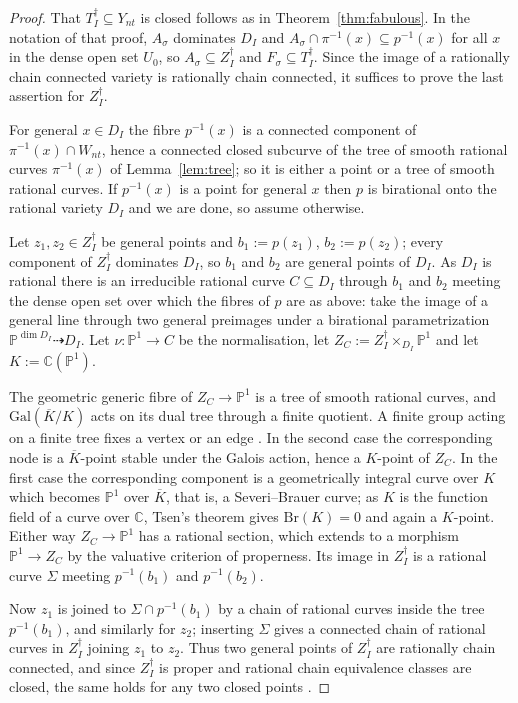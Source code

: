 \documentclass[11pt]{amsart}
\theoremstyle{plain}
\theoremstyle{definition}
\theoremstyle{remark}
\numberwithin{equation}{section}
\begin{document}
\begin{proof}
That $T_I^\dagger \subseteq Y_{nt}$ is closed follows as in
Theorem~\ref{thm:fabulous}.  In the notation of that proof, $A_\sigma$
dominates $D_I$ and $A_\sigma \cap \pi^{-1}(x) \subseteq p^{-1}(x)$ for all
$x$ in the dense open set $U_0$, so $A_\sigma \subseteq Z_I^\dagger$ and
$F_\sigma \subseteq T_I^\dagger$.  Since the image of a rationally chain
connected variety is rationally chain connected, it suffices to prove the
last assertion for $Z_I^\dagger$.

For general $x \in D_I$ the fibre $p^{-1}(x)$ is a connected component of
$\pi^{-1}(x) \cap W_{nt}$, hence a connected closed subcurve of the tree of
smooth rational curves $\pi^{-1}(x)$ of Lemma~\ref{lem:tree}; so it is
either a point or a tree of smooth rational curves.  If $p^{-1}(x)$ is a
point for general $x$ then $p$ is birational onto the rational variety
$D_I$ and we are done, so assume otherwise.

Let $z_1, z_2 \in Z_I^\dagger$ be general points and $b_1 := p(z_1)$,
$b_2 := p(z_2)$; every component of $Z_I^\dagger$ dominates $D_I$, so
$b_1$ and $b_2$ are general points of $D_I$.  As $D_I$ is rational there is
an irreducible rational curve $C \subseteq D_I$ through $b_1$ and $b_2$
meeting the dense open set over which the fibres of $p$ are as above: take
the image of a general line through two general preimages under a
birational parametrization $\mathbb{P}^{\dim D_I} \dasharrow D_I$.  Let
$\nu : \mathbb{P}^1 \to C$ be the normalisation, let
$Z_C := Z_I^\dagger \times_{D_I} \mathbb{P}^1$ and let $K :=
\mathbb{C}(\mathbb{P}^1)$.

The geometric generic fibre of $Z_C \to \mathbb{P}^1$ is a tree of smooth
rational curves, and $\mathrm{Gal}(\overline{K}/K)$ acts on its dual tree
through a finite quotient.  A finite group acting on a finite tree fixes a
vertex or an edge \cite{SerreTrees}.  In the second case the corresponding
node is a $\overline{K}$-point stable under the Galois action, hence a
$K$-point of $Z_C$.  In the first case the corresponding component is a
geometrically integral curve over $K$ which becomes $\mathbb{P}^1$ over
$\overline{K}$, that is, a Severi--Brauer curve; as $K$ is the function
field of a curve over $\mathbb{C}$, Tsen's theorem gives
$\mathrm{Br}(K) = 0$ and again a $K$-point.  Either way $Z_C \to
\mathbb{P}^1$ has a rational section, which extends to a morphism
$\mathbb{P}^1 \to Z_C$ by the valuative criterion of properness.  Its image
in $Z_I^\dagger$ is a rational curve $\Sigma$ meeting $p^{-1}(b_1)$ and
$p^{-1}(b_2)$.

Now $z_1$ is joined to $\Sigma \cap p^{-1}(b_1)$ by a chain of rational
curves inside the tree $p^{-1}(b_1)$, and similarly for $z_2$; inserting
$\Sigma$ gives a connected chain of rational curves in $Z_I^\dagger$
joining $z_1$ to $z_2$.  Thus two general points of $Z_I^\dagger$ are
rationally chain connected, and since $Z_I^\dagger$ is proper and rational
chain equivalence classes are closed, the same holds for any two closed
points \cite{KollarRationalCurves}.
\end{proof}
\end{document}
